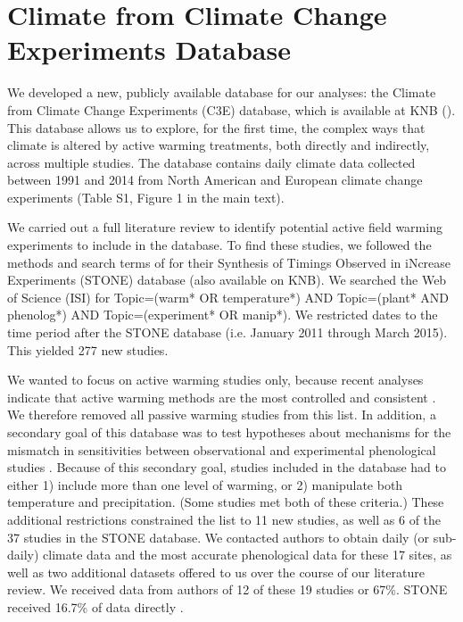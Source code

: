 \documentclass{article}
\begin{document}
\section* {Climate from Climate Change Experiments Database}
\par We developed a new, publicly available database for our analyses: the Climate from Climate Change Experiments (C3E) database, which is available at KNB (\citep{ettinger2017}). This database allows us to explore, for the first time, the complex ways that climate is altered by active warming treatments, both directly and indirectly, across multiple studies. The database contains daily climate data collected between 1991 and 2014 from North American and European climate change experiments (Table S1, Figure 1 in the main text). 
 \par We carried out a full literature review to identify potential active field warming experiments to include in the database. To find these studies, we followed the methods and search terms of \citet{wolkovich2012} for their Synthesis of Timings Observed in iNcrease Experiments (STONE) database (also available on KNB). We searched the Web of Science (ISI) for Topic=(warm* OR temperature*) AND Topic=(plant* AND phenolog*) AND Topic=(experiment* OR manip*). We restricted dates to the time period after the STONE database (i.e. January 2011 through March 2015). This yielded 277 new studies. 
 \par We wanted to focus on active warming studies only, because recent analyses indicate that active warming methods are the most controlled and consistent \citep{kimball2005,kimball2008,aronson2009,wolkovich2012}. We therefore removed all passive warming studies from this list. In addition, a secondary goal of this database was to test hypotheses about mechanisms for the mismatch in sensitivities between observational and experimental phenological studies \citep{wolkovich2012}. Because of this secondary goal, studies included in the database had to either 1) include more than one level of warming, or 2) manipulate both temperature and precipitation. (Some studies met both of these criteria.) These additional restrictions constrained the list to 11 new studies, as well as 6 of the 37 studies in the STONE database. We contacted authors to obtain daily (or sub-daily) climate data and the most accurate phenological data for these 17 sites, as well as two additional datasets offered to us over the course of our literature review.  We received data from authors of 12 of these 19 studies or 67\%. STONE received 16.7\% of data directly \citep{wolkovich2012}.
\end{document}
